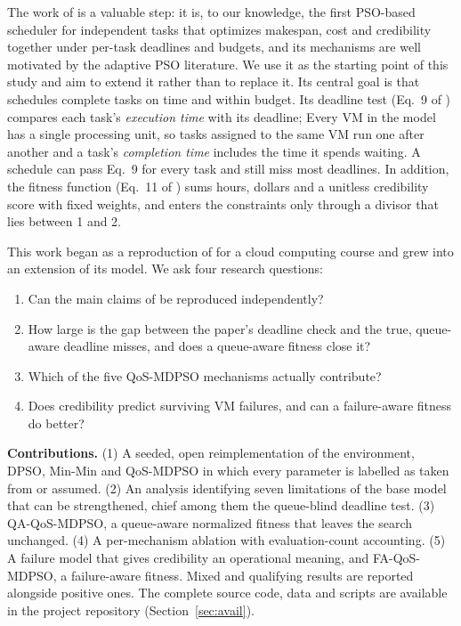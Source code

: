 \documentclass[pdflatex,sn-basic]{sn-jnl}
\theoremstyle{thmstyleone}%
\theoremstyle{thmstyletwo}%
\theoremstyle{thmstylethree}%
\begin{document}
The work of \citet{ouyang2025} is a valuable step: it is, to our knowledge, the first PSO-based scheduler for independent tasks that optimizes makespan, cost and credibility together under per-task deadlines and budgets, and its mechanisms are well motivated by the adaptive PSO literature. We use it as the starting point of this study and aim to extend it rather than to replace it. Its central goal is that schedules complete tasks on time and within budget. Its deadline test (Eq.~9 of \citet{ouyang2025}) compares each task's \emph{execution time} with its deadline; Every VM in the model has a single processing unit, so tasks assigned to the same VM run one after another and a task's \emph{completion time} includes the time it spends waiting. A schedule can pass Eq.~9 for every task and still miss most deadlines. In addition, the fitness function (Eq.~11 of \citet{ouyang2025}) sums hours, dollars and a unitless credibility score with fixed weights, and enters the constraints only through a divisor that lies between 1 and 2.

This work began as a reproduction of \citet{ouyang2025} for a cloud computing course and grew into an extension of its model. We ask four research questions:
\begin{enumerate}
\item[\textbf{RQ1}] Can the main claims of \citet{ouyang2025} be reproduced independently?
\item[\textbf{RQ2}] How large is the gap between the paper's deadline check and the true, queue-aware deadline misses, and does a queue-aware fitness close it?
\item[\textbf{RQ3}] Which of the five QoS-MDPSO mechanisms actually contribute?
\item[\textbf{RQ4}] Does credibility predict surviving VM failures, and can a failure-aware fitness do better?
\end{enumerate}

\textbf{Contributions.} (1) A seeded, open reimplementation of the environment, DPSO, Min-Min and QoS-MDPSO in which every parameter is labelled as taken from \citet{ouyang2025} or assumed. (2) An analysis identifying seven limitations of the base model that can be strengthened, chief among them the queue-blind deadline test. (3) QA-QoS-MDPSO, a queue-aware normalized fitness that leaves the search unchanged. (4) A per-mechanism ablation with evaluation-count accounting. (5) A failure model that gives credibility an operational meaning, and FA-QoS-MDPSO, a failure-aware fitness. Mixed and qualifying results are reported alongside positive ones. The complete source code, data and scripts are available in the project repository (Section~\ref{sec:avail}).
\end{document}
